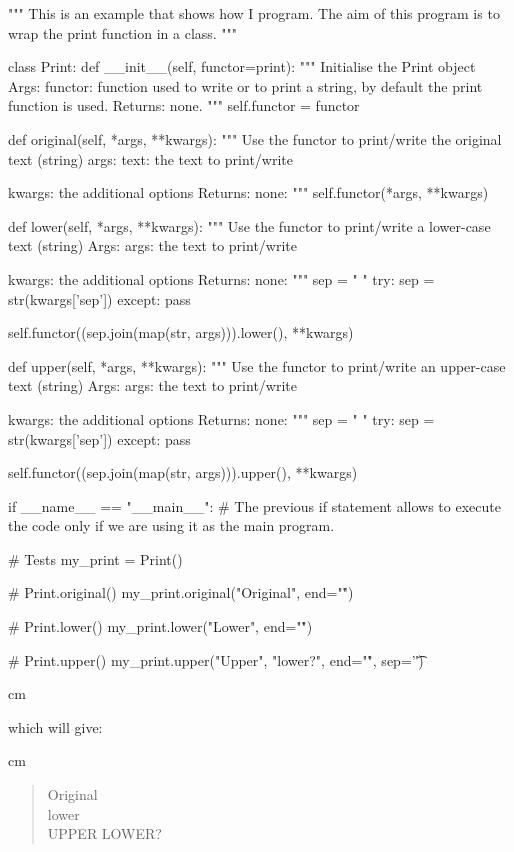 \documentclass[english, 12 pt, openany, oneside]{book}
\begin{document}
\begin{pyblock}[][breaklines]
"""
This is an example that shows how I program.
The aim of this program is to wrap the print function in a class.
"""

class Print:
	def __init__(self, functor=print):
		""" Initialise the Print object
			Args:
				functor:
				function used to write or to print a string, by default the print function is used.
			Returns:
			none.
		"""
		self.functor = functor
		
	def original(self, *args, **kwargs):
		""" Use the functor to print/write the original text (string)
			args:
				text:
				the text to print/write

				kwargs:
				the additional options
			Returns:
			none:			
		"""
		self.functor(*args, **kwargs)
	
	def lower(self, *args, **kwargs):
		""" Use the functor to print/write a lower-case text (string)
			Args:
				args:
				the text to print/write

				kwargs:
				the additional options
			Returns:
			none:	
		"""
		sep = " "
		try:
			sep = str(kwargs['sep'])
		except:
			pass

		self.functor((sep.join(map(str, args))).lower(), **kwargs)
		
	def upper(self, *args, **kwargs):
		""" Use the functor to print/write an upper-case text (string)
			Args:
				args:
				the text to print/write

				kwargs:
				the additional options
			Returns:
			none:	
		"""
		sep = " "
		try:
			sep = str(kwargs['sep'])
		except:
			pass

		self.functor((sep.join(map(str, args))).upper(), **kwargs)
		
if __name__ == "__main__":
	# The previous if statement allows to execute the code only if we are using it as the main program.
	
	# Tests
	my_print = Print()
	
	# Print.original()
	my_print.original("Original", end="\n\r")
	
	# Print.lower()
	my_print.lower("Lower", end="\n\r")
	
	# Print.upper()
	my_print.upper("Upper", "lower?", end="\n\r", sep='\t')
\end{pyblock}

 cm

which will give:

 cm

\blockquote{
Original\\
lower\\
UPPER   LOWER?
}
\end{document}

